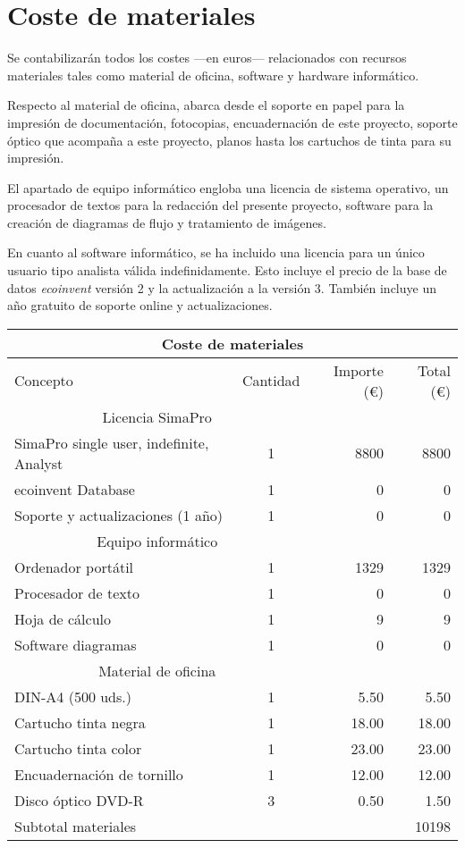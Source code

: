\chapter*{Coste de materiales}
Se contabilizarán todos los costes —en euros— relacionados con recursos materiales tales como material de oficina, software y hardware informático.

Respecto al material de oficina, abarca desde el soporte en papel para la impresión de documentación, fotocopias, encuadernación de este proyecto, soporte óptico que acompaña a este proyecto, planos hasta los cartuchos de tinta para su impresión.

El apartado de equipo informático engloba una licencia de sistema operativo, un procesador de textos para la redacción del presente proyecto, software para la creación de diagramas de flujo y tratamiento de imágenes.

En cuanto al software informático, se ha incluido una licencia para un único usuario tipo analista válida indefinidamente. Esto incluye el precio de la base de datos \textit{ecoinvent} versión 2 y la actualización a la versión 3. También incluye un año gratuito de soporte online y actualizaciones.

\begin{table}[!htb]
\centering
\begin{tabular}{lcrr}
\toprule
\multicolumn{4}{c}{Coste de materiales}\\
\midrule
Concepto & Cantidad & Importe (\euro) & Total (\euro)\\
\midrule
\multicolumn{2}{c}{Licencia SimaPro}\\
\cmidrule(r){1-2}
SimaPro single user, indefinite, Analyst & 1 & 8800 & 8800\\
ecoinvent Database & 1 & 0 & 0\\
Soporte y actualizaciones (1 año) & 1 & 0 & 0\\
\multicolumn{2}{c}{Equipo informático}\\
\cmidrule(r){1-2}
Ordenador portátil & 1 & 1329 & 1329\\
Procesador de texto & 1 & 0 & 0\\
Hoja de cálculo & 1 & 9 & 9\\
Software diagramas & 1 & 0 & 0\\
\multicolumn{2}{c}{Material de oficina}\\
\cmidrule(r){1-2}
DIN-A4 (500 uds.) & 1 & 5.50 & 5.50\\
Cartucho tinta negra & 1 & 18.00 & 18.00\\
Cartucho tinta color & 1 & 23.00 & 23.00\\
Encuadernación de tornillo & 1 & 12.00 & 12.00\\
Disco óptico DVD-R & 3 & 0.50 & 1.50\\
\bottomrule
Subtotal materiales & & & 10198\\
\bottomrule
\end{tabular}
\label{presupuestomateriales}
\end{table}

